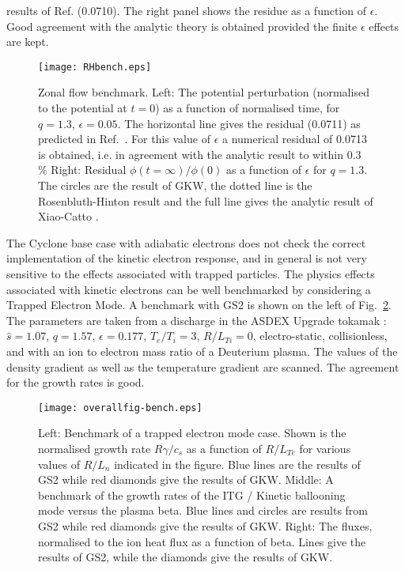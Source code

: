 results of Ref. \cite{XIA06} (0.0710). The right panel shows the residue as a function of $\epsilon$. 
Good agreement with the analytic theory is obtained provided the finite $\epsilon$ effects are kept.  
\begin{figure}[htb] 
\begin{center}
\texttt{[image: RHbench.eps]}
\caption{Zonal flow benchmark. Left: The potential perturbation (normalised to the potential at 
$t = 0$) as a function of normalised time, for $q = 1.3$, $\epsilon = 0.05$. The horizontal line gives the 
residual (0.0711) as predicted in Ref.~\cite{XIA06}. For this value of $\epsilon$ a numerical residual 
of 0.0713 is obtained, i.e. in agreement with the analytic result to within 0.3 \%
Right: Residual $\phi (t = \infty) / \phi(0) $ as a function of $\epsilon$ for 
$q = 1.3$. The circles are the result of GKW, the dotted line is the Rosenbluth-Hinton result \cite{HINROS} and 
the full line gives the analytic result of Xiao-Catto \cite{XIA06}. \label{zonalfig}} 
\label{overall1}
\end{center}
\end{figure}  

The Cyclone base case with adiabatic electrons does not check the correct implementation of the 
kinetic electron response, and in general is not very sensitive to the effects associated with trapped 
particles. 
The physics effects associated with kinetic electrons can be well benchmarked by considering a Trapped Electron 
Mode. A benchmark with GS2 is shown on the left of Fig.~\ref{overall2}. The parameters are 
taken from a discharge in the ASDEX Upgrade tokamak \cite{PEE05}: $\hat s = 1.07$, 
$q = 1.57$, $\epsilon = 0.177$, $T_e / T_i = 3$, $R/L_{Ti} = 0$, electro-static, collisionless, 
and with an ion to electron mass ratio of a Deuterium plasma. 
The values of the density gradient as well as the temperature gradient are scanned. 
The agreement for the growth rates is good.  

\begin{figure}[htb] 
\begin{center}
\texttt{[image: overallfig-bench.eps]}
\caption{Left: Benchmark of a trapped electron mode case. Shown is the normalised growth 
rate $R \gamma / c_s$ as a function of $R/L_{Te}$ for various values of $R/L_n$ indicated in 
the figure. Blue lines are the results of GS2 while red diamonds give the results of GKW. 
Middle: A benchmark of the growth rates of the ITG / Kinetic ballooning mode versus the plasma beta. 
Blue lines and circles 
are results from GS2 while red diamonds give the results of GKW. Right: The fluxes, normalised
to the ion heat flux as a function of beta. Lines give the results of GS2, while the diamonds give
the results of GKW.} 
\label{overall2}
\end{center}
\end{figure}  

